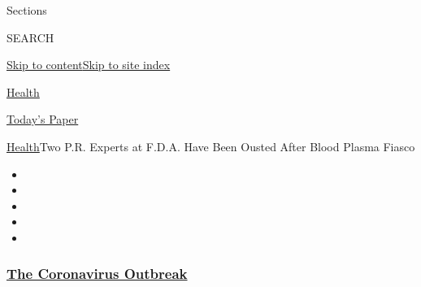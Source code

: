 Sections

SEARCH

\protect\hyperlink{site-content}{Skip to
content}\protect\hyperlink{site-index}{Skip to site index}

\href{https://www.nytimes3xbfgragh.onion/section/health}{Health}

\href{https://myaccount.nytimes3xbfgragh.onion/auth/login?response_type=cookie\&client_id=vi}{}

\href{https://www.nytimes3xbfgragh.onion/section/todayspaper}{Today's
Paper}

\href{/section/health}{Health}\textbar{}Two P.R. Experts at F.D.A. Have
Been Ousted After Blood Plasma Fiasco

\begin{itemize}
\item
\item
\item
\item
\item
\end{itemize}

\hypertarget{the-coronavirus-outbreak}{%
\subsubsection{\texorpdfstring{\href{https://www.nytimes3xbfgragh.onion/news-event/coronavirus?name=styln-coronavirus-national\&region=TOP_BANNER\&block=storyline_menu_recirc\&action=click\&pgtype=Article\&impression_id=e864c3c0-f52e-11ea-9589-49e10d004492\&variant=undefined}{The
Coronavirus
Outbreak}}{The Coronavirus Outbreak}}\label{the-coronavirus-outbreak}}

